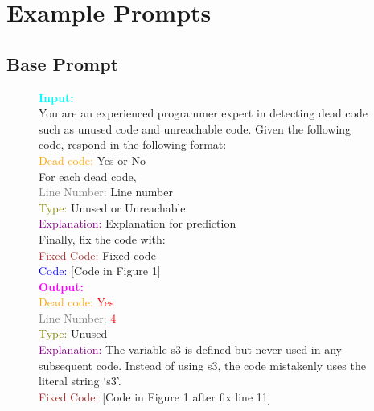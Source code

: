 \documentclass[11pt]{article}
\begin{document}
\section{Example Prompts}

\subsection{Base Prompt}

\begin{figure}[ht]
\begin{minipage}{\linewidth}
\small
\noindent\makebox[\linewidth]{\rule{\linewidth}{1pt}}
\colorbox{codebg}{
\parbox{\dimexpr\linewidth-2\fboxsep}{
\textbf{\textcolor{cyan}{Input:}} \\
You are an experienced programmer expert in detecting dead code such as unused code and unreachable code. Given the following code, respond in the following format: \\
\textcolor{orange}{Dead code:} Yes or No \\
For each dead code,\\
\textcolor{gray}{Line Number:} Line number\\
\textcolor{olive}{Type:} Unused or Unreachable\\
\textcolor{purple}{Explanation:} Explanation for prediction\\

Finally, fix the code with: \\
\textcolor{brown}{Fixed Code:} Fixed code \\

\textcolor{blue}{Code:} [Code in Figure 1] \\

\textbf{\textcolor{magenta}{Output:}} \\
\textcolor{orange}{Dead code:} \textcolor{red}{Yes} \\
\textcolor{gray}{Line Number:} \textcolor{red}{4} \\
\textcolor{olive}{Type:} Unused \\
\textcolor{purple}{Explanation:} The variable s3 is defined but never used in any subsequent code. Instead of using s3, the code mistakenly uses the literal string `s3'. \\

\textcolor{brown}{Fixed Code:} [Code in Figure 1 after fix line 11]
}}
\noindent\makebox[\linewidth]{\rule{\linewidth}{1.5pt}}
\end{minipage}
\end{figure}
\end{document}
